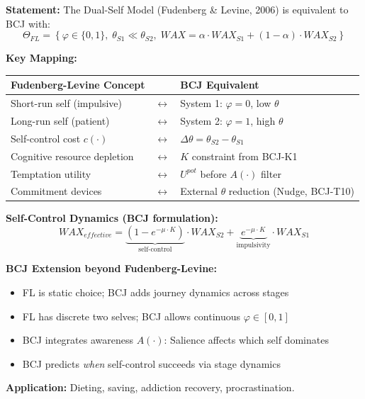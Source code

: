 \begin{tcolorbox}[colback=green!5!white, colframe=green!75!black,
    title=Theorem BCJ-T17: Fudenberg-Levine Dual-Self as Special Case]
\textbf{Statement:} The Dual-Self Model (Fudenberg \& Levine, 2006) is equivalent to BCJ with:
\begin{equation}
\Theta_{FL} = \left\{\varphi \in \{0, 1\}, \; \theta_{S1} \ll \theta_{S2}, \; WAX = \alpha \cdot WAX_{S1} + (1-\alpha) \cdot WAX_{S2}\right\}
\end{equation}

\textbf{Key Mapping:}
\begin{center}
\begin{tabular}{lcl}
\toprule
\textbf{Fudenberg-Levine Concept} & & \textbf{BCJ Equivalent} \\
\midrule
Short-run self (impulsive) & $\leftrightarrow$ & System 1: $\varphi = 0$, low $\theta$ \\
Long-run self (patient) & $\leftrightarrow$ & System 2: $\varphi = 1$, high $\theta$ \\
Self-control cost $c(\cdot)$ & $\leftrightarrow$ & $\Delta\theta = \theta_{S2} - \theta_{S1}$ \\
Cognitive resource depletion & $\leftrightarrow$ & $K$ constraint from BCJ-K1 \\
Temptation utility & $\leftrightarrow$ & $U^{pot}$ before $A(\cdot)$ filter \\
Commitment devices & $\leftrightarrow$ & External $\theta$ reduction (Nudge, BCJ-T10) \\
\bottomrule
\end{tabular}
\end{center}

\textbf{Self-Control Dynamics (BCJ formulation):}
\begin{equation}
WAX_{effective} = \underbrace{(1 - e^{-\mu \cdot K})}_{\text{self-control}} \cdot WAX_{S2} + \underbrace{e^{-\mu \cdot K}}_{\text{impulsivity}} \cdot WAX_{S1}
\end{equation}

\textbf{BCJ Extension beyond Fudenberg-Levine:}
\begin{itemize}[nosep]
\item FL is static choice; BCJ adds journey dynamics across stages
\item FL has discrete two selves; BCJ allows continuous $\varphi \in [0,1]$
\item BCJ integrates awareness $A(\cdot)$: Salience affects which self dominates
\item BCJ predicts \textit{when} self-control succeeds via stage dynamics
\end{itemize}

\textbf{Application:} Dieting, saving, addiction recovery, procrastination.
\end{tcolorbox}

